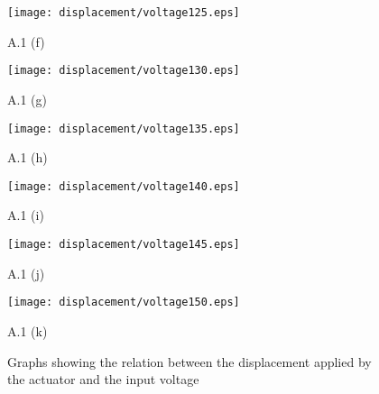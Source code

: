 %
%
\begin{figure}
\centering
\begin{minipage}{0.8\textwidth}
\begin{centering}
\texttt{[image: displacement/voltage125.eps]}
\centerline{\hspace{3mm}A.1 (f)}
\end{centering}
\vspace{1in}
\end{minipage}
\begin{minipage}{0.8\textwidth}
\begin{centering}
\texttt{[image: displacement/voltage130.eps]}
\centerline{A.1 (g)}
\end{centering}
\end{minipage}
\end{figure}
%
%
\begin{figure}
\centering
\begin{minipage}{0.8\textwidth}
\begin{centering}
\texttt{[image: displacement/voltage135.eps]}
\centerline{\hspace{3mm}A.1 (h)}
\end{centering}
\vspace{1in}
\end{minipage}
\begin{minipage}{0.8\textwidth}
\begin{centering}
\texttt{[image: displacement/voltage140.eps]}
\centerline{A.1 (i)}
\end{centering}
\end{minipage}
\end{figure}
%
%
\begin{figure}
\centering
\begin{minipage}{0.8\textwidth}
\begin{centering}
\texttt{[image: displacement/voltage145.eps]}
\centerline{\hspace{3mm}A.1 (j)}
\end{centering}
\vspace{1in}
\end{minipage}
\begin{minipage}{0.8\textwidth}
\begin{centering}
\texttt{[image: displacement/voltage150.eps]}
\centerline{A.1 (k)}
\end{centering}
\caption{Graphs showing the relation between the displacement applied by the actuator and the input voltage}
\end{minipage}
\end{figure}
%

